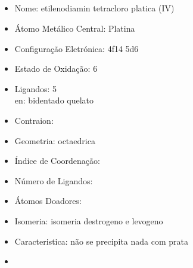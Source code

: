 \documentclass[12pt]{article}
\begin{document}
\noindent\begin{minipage}{\textwidth}
	
	\subsection{}
	\begin{itemize}
	
   \item Nome:
   	etilenodiamin tetracloro  platica (IV)
   
   \item Átomo Metálico Central:
   	Platina
   	
   \item Configuração Eletrónica:
   	4f14 5d6
   
   \item Estado de Oxidação:
   	6
   
   \item Ligandos:
   	5\\
		en: bidentado quelato
   
   \item Contraion:
   	
   
   \item Geometria:
   	octaedrica
   
   \item Índice de Coordenação: 
   
   
   \item Número de Ligandos:
   
   
   \item Átomos Doadores:
   
   
   \item Isomeria:
   	isomeria destrogeno e levogeno
	
	\item Caracteristica:
		não se precipita nada com prata
		
	\item 
	
	\end{itemize}
	
\end{minipage}
\end{document}
